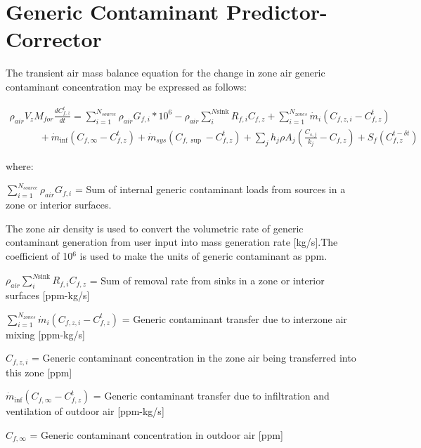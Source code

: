 \section{Generic Contaminant Predictor-Corrector}\label{generic-contaminant-predictor-corrector}

The transient air mass balance equation for the change in zone air generic contaminant concentration may be expressed as follows:

\begin{equation}
\begin{array}{l}{\rho_{air}}{V_z}{M_{for}}\frac{{dC_{f,z}^t}}{{dt}} = \sum\limits_{i = 1}^{{N_{source}}} {{\rho_{air}}{G_{f,i}}*{{10}^6} - } {\rho_{air}}\sum\limits_i^{N{\mathrm{sink}}} {{R_{f,i}}{C_{f,z}}}  + \sum\limits_{i = 1}^{{N_{zones}}} {{{\dot m}_i}} \left( {{C_{f,z,i}} - C_{f,z}^t} \right) \\
\quad \quad \quad + {{\dot m}_{\inf }}\left( {{C_{f,\infty }} - C_{f,z}^t} \right) + {{\dot m}_{sys}}\left( {{C_{f,\sup }} - C_{f,z}^t} \right) + \sum\limits_j {{h_j}\rho {A_j}(\frac{{{C_{s,j}}}}{{{k_j}}} - {C_{f,z}})}  + {S_f}(C_{f,z}^{t - \delta t})\end{array}
\end{equation}

where:

\(\sum\limits_{i = 1}^{{N_{source}}} {{\rho_{air}}{G_{f,i}}}\) = Sum of internal generic contaminant loads from sources in a zone or interior surfaces.

The zone air density is used to convert the volumetric rate of generic contaminant generation from user input into mass generation rate {[}kg/s{]}.The coefficient of 10\(^{6}\) is used to make the units of generic contaminant as ppm.

\({\rho_{air}}\sum\limits_i^{N{\mathrm{sink}}} {{R_{f,i}}{C_{f,z}}}\) = Sum of removal rate from sinks in a zone or interior surfaces {[}ppm-kg/s{]}

\(\sum_{i = 1}^{N_{zones}} \dot m_i \left( C_{f,z,i} - C_{f,z}^t \right)\) = Generic contaminant transfer due to interzone air mixing {[}ppm-kg/s{]}

\({C_{f,z,i}}\) = Generic contaminant concentration in the zone air being transferred into this zone {[}ppm{]}

\({\dot m_{\inf }}\left( {{C_{f,\infty }} - C_{f,z}^t} \right)\) = Generic contaminant transfer due to infiltration and ventilation of outdoor air {[}ppm-kg/s{]}

\({C_{f,\infty }}\) = Generic contaminant concentration in outdoor air {[}ppm{]}

